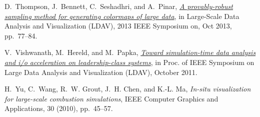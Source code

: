 \documentclass[final]{siamltex}
\begin{document}
\begin{thebibliography}{10}
{\sc D.~Thompson, J.~Bennett, C.~Seshadhri, and A.~Pinar},
  \href{http://dx.doi.org/10.1109/LDAV.2013.6675161}{{\em A provably-robust
  sampling method for generating colormaps of large data}}, in Large-Scale Data
  Analysis and Visualization (LDAV), 2013 IEEE Symposium on, Oct 2013,
  pp.~77--84.

{\sc V.~Vishwanath, M.~Hereld, and M.~Papka},
  \href{http://dx.doi.org/10.1109/LDAV.2011.6092178}{{\em Toward
  simulation-time data analysis and i/o acceleration on leadership-class
  systems}}, in Proc. of IEEE Symposium on Large Data Analysis and
  Visualization (LDAV), October 2011.

{\sc H.~Yu, C.~Wang, R.~W. Grout, J.~H. Chen, and K.-L. Ma}, {\em In-situ
  visualization for large-scale combustion simulations}, IEEE Computer Graphics
  and Applications, 30 (2010), pp.~45--57.

\end{thebibliography}
\end{document}
